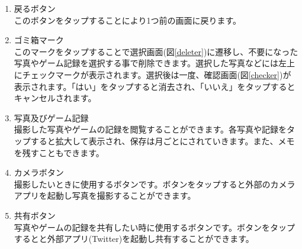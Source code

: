 \documentclass[a4j]{jarticle}
\begin{document}
\begin{enumerate}
  \renewcommand{\labelenumi}{\textcircled{\scriptsize \theenumi}}
  \item 戻るボタン\\
       このボタンをタップすることにより1つ前の画面に戻ります。
  \item ゴミ箱マーク\\
      このマークをタップすることで選択画面(図\ref{deleter})に遷移し、不要になった写真やゲーム記録を選択する事で削除できます。選択した写真などには左上にチェックマークが表示されます。選択後は一度、確認画面(図\ref{checker})が表示されます。「はい」をタップすると消去され、「いいえ」をタップするとキャンセルされます。
  \item 写真及びゲーム記録\\
       撮影した写真やゲームの記録を閲覧することができます。各写真や記録をタップすると拡大して表示され、保存は月ごとにされていきます。また、メモを残すこともできます。
  \item カメラボタン\\
        撮影したいときに使用するボタンです。ボタンをタップすると外部のカメラアプリを起動し写真を撮影することができます。
  \item 共有ボタン　\label{enum:share}\\
        写真やゲームの記録を共有したい時に使用するボタンです。ボタンをタップするとと外部アプリ(Twitter)を起動し共有することができます。
\end{enumerate}
\end{document}
